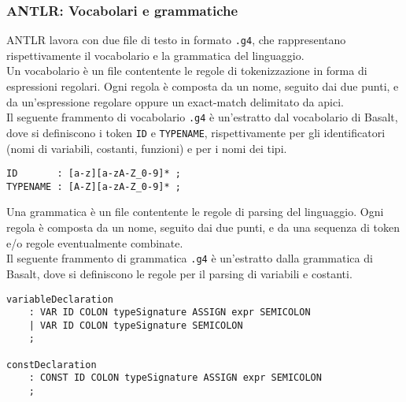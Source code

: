 \subsubsection{ANTLR: Vocabolari e grammatiche}
ANTLR lavora con due file di testo in formato \texttt{.g4}, che rappresentano rispettivamente 
il vocabolario e la grammatica del linguaggio. \\

Un vocabolario è un file contentente le regole di tokenizzazione in forma di espressioni regolari. 
Ogni regola è composta da un nome, seguito dai due punti, e da un'espressione regolare oppure un exact-match 
delimitato da apici. \\

Il seguente frammento di vocabolario \texttt{.g4} è un'estratto dal vocabolario di Basalt,
dove si definiscono i token \texttt{ID} e \texttt{TYPENAME}, rispettivamente per gli identificatori
(nomi di variabili, costanti, funzioni) e per i nomi dei tipi. \\

\vspace{0.3cm}
\begin{lstlisting}[frame=single]
ID       : [a-z][a-zA-Z_0-9]* ;
TYPENAME : [A-Z][a-zA-Z_0-9]* ;
\end{lstlisting}
\vspace{0.3cm}

Una grammatica è un file contentente le regole di parsing del linguaggio. Ogni regola è composta da un nome,
seguito dai due punti, e da una sequenza di token e/o regole eventualmente combinate. \\

Il seguente frammento di grammatica \texttt{.g4} è un'estratto dalla grammatica di Basalt, dove si definiscono
le regole per il parsing di variabili e costanti.  \\

\vspace{0.3cm}
\begin{lstlisting}[frame=single]
variableDeclaration
    : VAR ID COLON typeSignature ASSIGN expr SEMICOLON
    | VAR ID COLON typeSignature SEMICOLON
    ;
    
constDeclaration
    : CONST ID COLON typeSignature ASSIGN expr SEMICOLON
    ; 
\end{lstlisting}
\vspace{0.3cm}